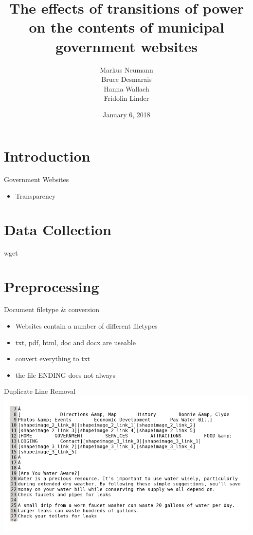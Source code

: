 \documentclass[12pt]{beamer}
\title[]{The effects of transitions of power on the contents of
	municipal government websites}
\author{Markus Neumann \\ Bruce Desmarais \\ Hanna Wallach \\ Fridolin Linder}
\institute{The Pennsylvania State University}
\date{January 6, 2018}
\begin{document}
\section{Introduction}
\begin{frame}
\titlepage
\end{frame}


\begin{frame}{Government Websites}
\linespread{1.5}
{\large
	\begin{itemize}
	\item Transparency
	\end{itemize}
	}
\end{frame}

\section{Data Collection}
\begin{frame}{wget}
\end{frame}

\section{Preprocessing}

\begin{frame}{Document filetype \& conversion}
\begin{itemize}
	\item Websites contain a number of different filetypes
	\item txt, pdf, html, doc and docx are useable
	\item convert everything to txt
	\item the file ENDING does not always 
\end{itemize}
\end{frame}

\begin{frame}{Duplicate Line Removal}
\includegraphics[width = \linewidth]{duplicateLines.png}
\end{frame}
\end{document}
